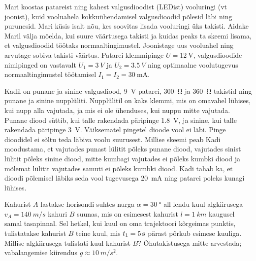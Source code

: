 \documentclass[10pt]{article}
\begin{document}
Mari koostas patareist ning kahest valgusdioodist (LEDist) vooluringi (vt joonist), kuid vooluahela kokkuühendamisel valgusdioodid põlesid läbi ning purunesid. Mari küsis isalt nõu, kes soovitas lisada vooluringi üks takisti. Aidake Maril välja mõelda, kui suure väärtusega takisti ja kuidas peaks ta skeemi lisama, et valgusdioodid töötaks normaaltingimustel. Joonistage uus vooluahel ning arvutage sobiva takisti väärtus. Patarei klemmipinge $U=\SI{12}{\V}$, valgusdioodide nimipinged on vastavalt $U_1=\SI{3}{V}$ ja $U_2=\SI{3.5}{V}$ ning optimaalne voolutugevus normaaltingimustel töötamisel $I_1=I_2=\SI{30}{\milli\A}$.
\probend
\bigskip


Kadil on punane ja sinine valgusdiood, \SI{9}{\V} patarei, \SI{300}{\ohm} ja \SI{360}{\ohm} takistid ning punane ja sinine nupplüliti. Nupplülitil on kaks klemmi, mis on omavahel lühises, kui nupp alla vajutada, ja mis ei ole ühenduses, kui nuppu mitte vajutada. Punane diood süttib, kui talle rakendada päripinge \SI{1.8}{\V}, ja sinine, kui talle rakendada päripinge \SI{3}{\V}. Väiksematel pingetel dioode vool ei läbi. Pinge dioodidel ei sõltu teda läbiva voolu suurusest. Millise skeemi peab Kadi moodustama, et vajutades punast lülitit põleks punane diood, vajutades sinist lülitit põleks sinine diood, mitte kumbagi vajutades ei põleks kumbki diood ja mõlemat lülitit vajutades samuti ei põleks kumbki diood. Kadi tahab ka, et dioodi põlemisel läbiks seda vool tugevusega \SI{20}{\mA} ning patarei poleks kunagi lühises.
\probend
\bigskip


Kahurist $A$ lastakse horisondi suhtes nurga $\alpha=\SI{30}{\degree}$ all lendu kuul algkiirusega $v_A=\SI{140}{m/s}$ kahuri $B$ suunas, mis on esimesest kahurist $l=\SI{1}{km}$ kaugusel samal tasapinnal. Sel hetkel, kui kuul on oma trajektoori kõrgeimas punktis, tulistatakse kahurist $B$ teine kuul, mis $t_1=\SI 5s$ pärast põrkub  esimese kuuliga. Millise algkiirusega tulistati kuul kahurist $B$? Õhutakistusega mitte arvestada; vabalangemise kiirendus $g\approx\SI{10}{m/s^2}$.
\probend
\bigskip

\end{document}

